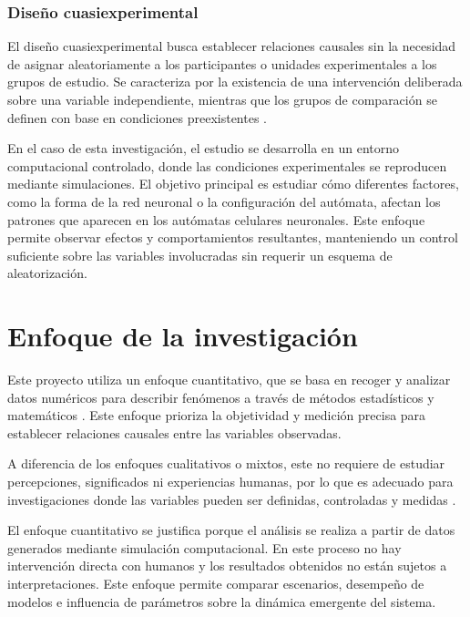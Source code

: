 \subsubsection{Diseño cuasiexperimental}

El diseño cuasiexperimental busca establecer relaciones causales sin la necesidad de asignar aleatoriamente a los participantes o unidades experimentales a los grupos de estudio. Se caracteriza por la existencia de una intervención deliberada sobre una variable independiente, mientras que los grupos de comparación se definen con base en condiciones preexistentes \cite{capili2024_cuasiexperimento}.

En el caso de esta investigación, el estudio se desarrolla en un entorno computacional controlado, donde las condiciones experimentales se reproducen mediante simulaciones. El objetivo principal es estudiar cómo diferentes factores, como la forma de la red neuronal o la configuración del autómata, afectan los patrones que aparecen en los autómatas celulares neuronales. Este enfoque permite observar efectos y comportamientos resultantes, manteniendo un control suficiente sobre las variables involucradas sin requerir un esquema de aleatorización.

\section{Enfoque de la investigación}

Este proyecto utiliza un enfoque cuantitativo, que se basa en recoger y analizar datos numéricos para describir fenómenos a través de métodos estadísticos y matemáticos \cite{jaen_cuantitativa}. Este enfoque prioriza la objetividad y medición precisa para establecer relaciones causales entre las variables observadas.

A diferencia de los enfoques cualitativos o mixtos, este no requiere de estudiar percepciones, significados ni experiencias humanas, por lo que es adecuado para investigaciones donde las variables pueden ser definidas, controladas y medidas \cite{cueva2023_mixto}.

El enfoque cuantitativo se justifica porque el análisis se realiza a partir de datos generados mediante simulación computacional. En este proceso no hay intervención directa con humanos y los resultados obtenidos no están sujetos a interpretaciones. Este enfoque permite comparar escenarios, desempeño de modelos e influencia de parámetros sobre la dinámica emergente del sistema.

